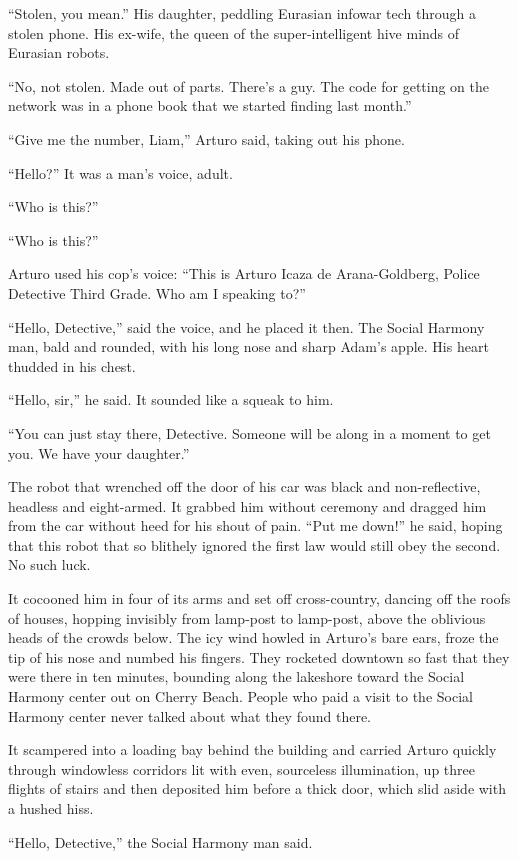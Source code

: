 “Stolen, you mean.” His daughter, peddling Eurasian infowar tech
through a stolen phone. His ex-wife, the queen of the
super-intelligent hive minds of Eurasian robots.

“No, not stolen. Made out of parts. There’s a guy. The code for
getting on the network was in a phone book that we started finding
last month.”

“Give me the number, Liam,” Arturo said, taking out his phone.

\tb

“Hello?” It was a man’s voice, adult.

“Who is this?”

“Who is this?”

Arturo used his cop’s voice: “This is Arturo Icaza de
Arana-Goldberg, Police Detective Third Grade. Who am I speaking
to?”

“Hello, Detective,” said the voice, and he placed it then. The
Social Harmony man, bald and rounded, with his long nose and sharp
Adam’s apple. His heart thudded in his chest.

“Hello, sir,” he said. It sounded like a squeak to him.

“You can just stay there, Detective. Someone will be along in a
moment to get you. We have your daughter.”

The robot that wrenched off the door of his car was black and
non-reflective, headless and eight-armed. It grabbed him without
ceremony and dragged him from the car without heed for his shout of
pain. “Put me down!” he said, hoping that this robot that so
blithely ignored the first law would still obey the second. No such
luck.

It cocooned him in four of its arms and set off cross-country,
dancing off the roofs of houses, hopping invisibly from lamp-post
to lamp-post, above the oblivious heads of the crowds below. The
icy wind howled in Arturo’s bare ears, froze the tip of his nose
and numbed his fingers. They rocketed downtown so fast that they
were there in ten minutes, bounding along the lakeshore toward the
Social Harmony center out on Cherry Beach. People who paid a visit
to the Social Harmony center never talked about what they found
there.

It scampered into a loading bay behind the building and carried
Arturo quickly through windowless corridors lit with even,
sourceless illumination, up three flights of stairs and then
deposited him before a thick door, which slid aside with a hushed
hiss.

“Hello, Detective,” the Social Harmony man said.

